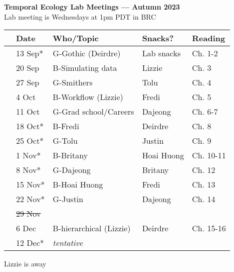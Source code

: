 \documentclass[11pt]{article}
\begin{document}
 
\raggedright
{}

\begin{center} 
{\large \textbf{Temporal Ecology Lab Meetings --- Autumn 2023}} \\ [2pt]
Lab meeting is Wednesdays at 1pm PDT in BRC\\ %
\end{center} 

\begin{center}
\begin{tabular}{ p{0.2 cm}  p{2 cm}  p{4.5 cm}  p{3 cm}  p{3.5 cm} }  \hline \hline
 & \textbf{Date}
   & \textbf{Who/Topic}
      & \textbf{Snacks?} 
         & \textbf{Reading} \\ 
\hline \hline
&13 Sep* & G-Gothic (Deirdre)  &   Lab snacks    & Ch. 1-2 \\\hline
 & 20 Sep & B-Simulating data & Lizzie & Ch. 3 \\\hline
 & 27 Sep & G-Smithers & Tolu & Ch. 4 \\\hline  
 & 4 Oct &  B-Workflow (Lizzie)   & Fredi &  Ch. 5 \\\hline
 & 11 Oct  & G-Grad school/Careers  & Dajeong &  Ch. 6-7 \\\hline 
 & 18 Oct* & B-Fredi & Deirdre & Ch. 8  \\\hline
 & 25 Oct*  & G-Tolu & Justin & Ch. 9\\\hline
 & 1 Nov* &  B-Britany  & Hoai Huong & Ch. 10-11  \\\hline 
  & 8 Nov*  &  G-Dajeong & Britany &  Ch. 12 \\\hline
 & 15 Nov*  &  B-Hoai Huong  & Fredi &  Ch. 13\\\hline
  & 22 Nov*  &  G-Justin & Dajeong & Ch. 14 \\\hline
 & \sout{29 Nov}  &    &  &  \\\hline
 & 6 Dec  & B-hierarchical (Lizzie)    & Deirdre & Ch. 15-16 \\\hline
 & 12 Dec*  &  \emph{tentative}    &  & \\\hline
\hline
\end{tabular}
\end{center}
\noindent *Lizzie is away \\
\end{document}
